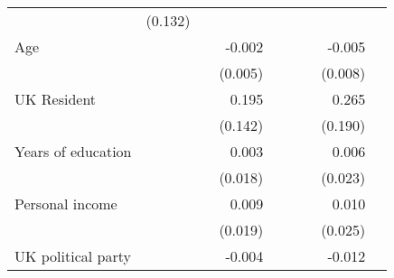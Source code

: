 \documentclass{article}
\begin{document}
\begin{table}[!h]
\begin{tabular}{lllllllll}
  \multicolumn{1}{l}{} &
  \multicolumn{1}{r}{(0.132)} &
  \multicolumn{1}{l}{} \\
\multicolumn{1}{l}{Age} &
  \multicolumn{1}{r}{} &
  \multicolumn{1}{l}{} &
  \multicolumn{1}{r}{-0.002} &
  \multicolumn{1}{l}{} &
  \multicolumn{1}{r}{} &
  \multicolumn{1}{l}{} &
  \multicolumn{1}{r}{-0.005} &
  \multicolumn{1}{l}{} \\
\multicolumn{1}{l}{} &
  \multicolumn{1}{r}{} &
  \multicolumn{1}{l}{} &
  \multicolumn{1}{r}{(0.005)} &
  \multicolumn{1}{l}{} &
  \multicolumn{1}{r}{} &
  \multicolumn{1}{l}{} &
  \multicolumn{1}{r}{(0.008)} &
  \multicolumn{1}{l}{} \\
\multicolumn{1}{l}{UK Resident} &
  \multicolumn{1}{r}{} &
  \multicolumn{1}{l}{} &
  \multicolumn{1}{r}{0.195} &
  \multicolumn{1}{l}{} &
  \multicolumn{1}{r}{} &
  \multicolumn{1}{l}{} &
  \multicolumn{1}{r}{0.265} &
  \multicolumn{1}{l}{} \\
\multicolumn{1}{l}{} &
  \multicolumn{1}{r}{} &
  \multicolumn{1}{l}{} &
  \multicolumn{1}{r}{(0.142)} &
  \multicolumn{1}{l}{} &
  \multicolumn{1}{r}{} &
  \multicolumn{1}{l}{} &
  \multicolumn{1}{r}{(0.190)} &
  \multicolumn{1}{l}{} \\
\multicolumn{1}{l}{Years of education} &
  \multicolumn{1}{r}{} &
  \multicolumn{1}{l}{} &
  \multicolumn{1}{r}{0.003} &
  \multicolumn{1}{l}{} &
  \multicolumn{1}{r}{} &
  \multicolumn{1}{l}{} &
  \multicolumn{1}{r}{0.006} &
  \multicolumn{1}{l}{} \\
\multicolumn{1}{l}{} &
  \multicolumn{1}{r}{} &
  \multicolumn{1}{l}{} &
  \multicolumn{1}{r}{(0.018)} &
  \multicolumn{1}{l}{} &
  \multicolumn{1}{r}{} &
  \multicolumn{1}{l}{} &
  \multicolumn{1}{r}{(0.023)} &
  \multicolumn{1}{l}{} \\
\multicolumn{1}{l}{Personal income} &
  \multicolumn{1}{r}{} &
  \multicolumn{1}{l}{} &
  \multicolumn{1}{r}{0.009} &
  \multicolumn{1}{l}{} &
  \multicolumn{1}{r}{} &
  \multicolumn{1}{l}{} &
  \multicolumn{1}{r}{0.010} &
  \multicolumn{1}{l}{} \\
\multicolumn{1}{l}{} &
  \multicolumn{1}{r}{} &
  \multicolumn{1}{l}{} &
  \multicolumn{1}{r}{(0.019)} &
  \multicolumn{1}{l}{} &
  \multicolumn{1}{r}{} &
  \multicolumn{1}{l}{} &
  \multicolumn{1}{r}{(0.025)} &
  \multicolumn{1}{l}{} \\
\multicolumn{1}{l}{UK political party} &
  \multicolumn{1}{r}{} &
  \multicolumn{1}{l}{} &
  \multicolumn{1}{r}{-0.004} &
  \multicolumn{1}{l}{} &
  \multicolumn{1}{r}{} &
  \multicolumn{1}{l}{} &
  \multicolumn{1}{r}{-0.012} &

\end{tabular}
\end{table}
\end{document}
